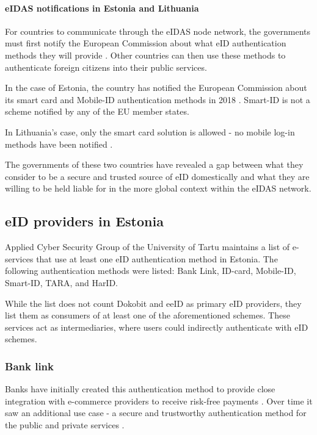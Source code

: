 \paragraph{eIDAS notifications in Estonia and Lithuania}

For countries to communicate through the eIDAS node network, the governments must first notify the European Commission about what eID authentication methods they will provide \cite{eulaw-eidas}. Other countries can then use these methods to authenticate foreign citizens into their public services.

In the case of Estonia, the country has notified the European Commission about its smart card and Mobile-ID authentication methods in 2018 \cite{eulaw-eidas-notified}. Smart-ID is not a scheme notified by any of the EU member states.

In Lithuania's case, only the smart card solution is allowed - no mobile log-in methods have been notified \cite{eulaw-eidas-notified}.

The governments of these two countries have revealed a gap between what they consider to be a secure and trusted source of eID domestically and what they are willing to be held liable for in the more global context within the eIDAS network.

\subsection{eID providers in Estonia}

Applied Cyber Security Group of the University of Tartu maintains a list of e-services \cite{ut-eidinestonia} that use at least one eID authentication method in Estonia. The following authentication methods were listed: Bank Link, ID-card, Mobile-ID, Smart-ID, TARA, and HarID.

While the list does not count Dokobit and eeID as primary eID providers, they list them as consumers of at least one of the aforementioned schemes. These services act as intermediaries, where users could indirectly authenticate with eID schemes.

\subsubsection{Bank link}

Banks have initially created this authentication method to provide close integration with e-commerce providers to receive risk-free payments \cite{kerem2003internet}. Over time it saw an additional use case - a secure and trustworthy authentication method for the public and private services \cite{sebbanklink}.

